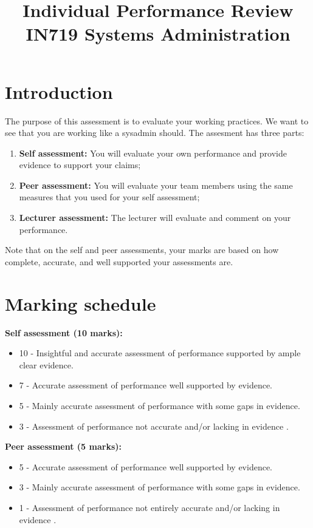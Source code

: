 \documentclass{article}   	%
\title{Individual Performance Review\\ IN719 Systems Administration}
\date{}							%
\begin{document}
\maketitle

\section*{Introduction}
The purpose of this assessment is to evaluate your working practices.  We want to see that you are working like a sysadmin should.  The assesment has three parts:

\begin{enumerate}
  \item  \textbf{Self assessment:}  You will evaluate your own performance and provide evidence to support your claims;
  \item  \textbf{Peer assessment:}  You will evaluate your team members using the same measures that you used for your self assessment;
  \item  \textbf{Lecturer assessment:}  The lecturer will evaluate and comment on your performance.
\end{enumerate}

Note that on the self and peer assessments, your marks are based on how complete, accurate, and well supported your assessments are.

\section*{Marking schedule}
\textbf{Self assessment (10 marks):}

\begin{itemize}
  \item 10 - Insightful and accurate assessment of performance supported by ample clear evidence.
  \item 7 - Accurate assessment of performance well supported by evidence.
  \item 5 - Mainly accurate assessment of performance with some gaps in evidence.
  \item 3 - Assessment of performance not accurate and/or lacking in evidence .
\end{itemize}

\textbf{Peer assessment (5 marks):}

\begin{itemize}
  \item 5 - Accurate assessment of performance well supported by evidence.
  \item 3 - Mainly accurate assessment of performance with some gaps in evidence.
  \item 1 - Assessment of performance not entirely accurate and/or lacking in evidence .
\end{itemize}
\end{document}
